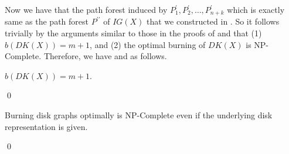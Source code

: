 Now we have that the path forest induced by $P_1^\prime,P_2^\prime,\dots,P_{n+k}^\prime$ which is exactly same as the path forest $P^{\prime\prime}$ of $IG(X)$ that we constructed in . So it follows trivially by the arguments similar to those in the proofs of  and  that (1) $b(DK(X))=m+1$, and (2) the optimal burning of $DK(X)$ is NP-Complete. Therefore, we have  and  as follows.

\begin{lemma}\label{lemma:b(DK(X))=m+1}
    $b(DK(X))= m+1$.
\end{lemma}\qed

\begin{theorem}\label{theorem:BDGNPC}
    Burning disk graphs optimally is NP-Complete even if the underlying disk representation is given.
\end{theorem}\qed


            
            
            
            
            
